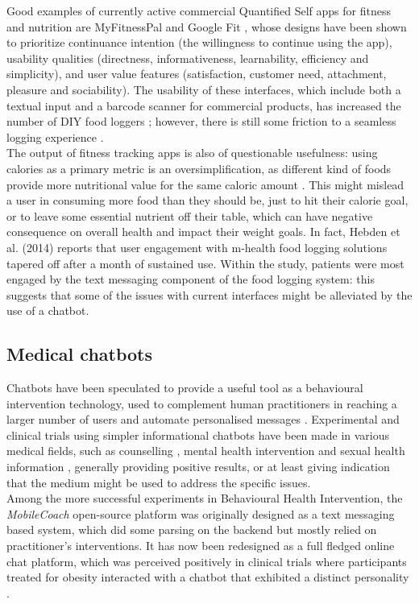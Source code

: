 Good examples of currently active commercial Quantified Self apps for fitness and nutrition are MyFitnessPal \cite{mfpwebsite} and Google Fit \cite{googlefitwebsite}, whose designs have been shown \cite{Suzianti2017} to prioritize continuance intention (the willingness to continue using the app), usability qualities (directness, informativeness, learnability, efficiency and simplicity), and user value features (satisfaction, customer need, attachment, pleasure and sociability). The usability of these interfaces, which include both a textual input and a barcode scanner for commercial products, has increased the number of DIY food loggers \cite{Alonso2015}; however, there is still some friction to a seamless logging experience \cite{Boushey2016}. \\
The output of fitness tracking apps is also of questionable usefulness: using calories as a primary metric is an oversimplification, as different kind of foods provide more nutritional value for the same caloric amount \cite{webmdcalories}. This might mislead a user in consuming more food than they should be, just to hit their calorie goal, or to leave some essential nutrient off their table, which can have negative consequence on overall health and impact their weight goals. In fact, Hebden et al. (2014)\cite{hebden2014} reports that user engagement with m-health food logging solutions tapered off after a month of sustained use. Within the study, patients were most engaged by the text messaging component of the food logging system: this suggests that some of the issues with current interfaces might be alleviated by the use of a chatbot. 
\subsection{Medical chatbots} 
Chatbots have been speculated to provide a useful tool as a behavioural intervention technology, used to complement human practitioners in reaching a larger number of users and automate personalised messages \cite{Gabrielli2017}. Experimental and clinical trials using simpler informational chatbots have been made in various medical fields, such as counselling \cite{Cameron}, mental health intervention \cite{Elmasri2012} and sexual health information \cite{Brixey2017}, generally providing positive results, or at least giving indication that the medium might be used to address the specific issues. \\
Among the more successful experiments in Behavioural Health Intervention, the \textit{MobileCoach} open-source platform \cite{mobilecoacheu} was originally designed as a text messaging based system, which did some parsing on the backend but mostly relied on practitioner's interventions. It has now been redesigned as a full fledged online chat platform, which was perceived positively in clinical trials where participants treated for obesity interacted with a chatbot that exhibited a distinct personality \cite{Kowatsch2017}.

